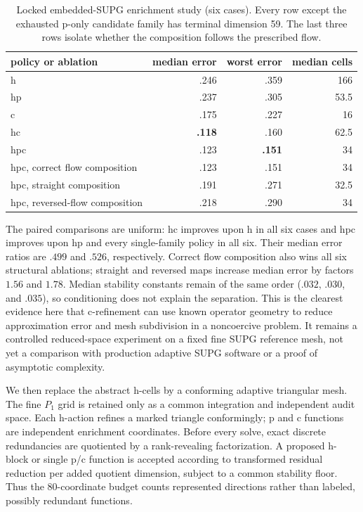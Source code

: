 \documentclass[11pt]{article}
\numberwithin{algorithm}{section}
\theoremstyle{definition}\newtheorem{definition}[theorem]{Definition}
\theoremstyle{remark}\newtheorem{remark}[theorem]{Remark}
\begin{document}
\begin{table}[t]
\centering
\caption{Locked embedded-SUPG enrichment study (six cases). Every row except
the exhausted p-only candidate family has terminal dimension 59. The last three
rows isolate whether the composition follows the prescribed flow.}
\label{tab:supg-flow-composition}
\begin{tabular}{lrrr}
\toprule
policy or ablation & median error & worst error & median cells\\
\midrule
h & .246 & .359 & 166\\
hp & .237 & .305 & 53.5\\
c & .175 & .227 & 16\\
hc & \textbf{.118} & .160 & 62.5\\
hpc & .123 & \textbf{.151} & 34\\
\midrule
hpc, correct flow composition & .123 & .151 & 34\\
hpc, straight composition & .191 & .271 & 32.5\\
hpc, reversed-flow composition & .218 & .290 & 34\\
\bottomrule
\end{tabular}
\end{table}

The paired comparisons are uniform: hc improves upon h in all six cases and
hpc improves upon hp and every single-family policy in all six. Their median
error ratios are $.499$ and $.526$, respectively. Correct flow composition
also wins all six structural ablations; straight and reversed maps increase
median error by factors $1.56$ and $1.78$. Median stability constants remain
of the same order ($.032$, $.030$, and $.035$), so conditioning does not explain
the separation. This is the clearest evidence here that c-refinement can use
known operator geometry to reduce approximation error and mesh subdivision in
a noncoercive problem. It remains a controlled reduced-space experiment on a
fixed fine SUPG reference mesh, not yet a comparison with production adaptive
SUPG software or a proof of asymptotic complexity.

We then replace the abstract h-cells by a conforming adaptive triangular mesh.
The fine $P_1$ grid is retained only as a common integration and independent
audit space.  Each h-action refines a marked triangle conformingly; p and c
functions are independent enrichment coordinates.  Before every solve, exact
discrete redundancies are quotiented by a rank-revealing factorization.  A
proposed h-block or single p/c function is accepted according to transformed
residual reduction per added quotient dimension, subject to a common stability
floor.  Thus the 80-coordinate budget counts represented directions rather
than labeled, possibly redundant functions.
\end{document}
